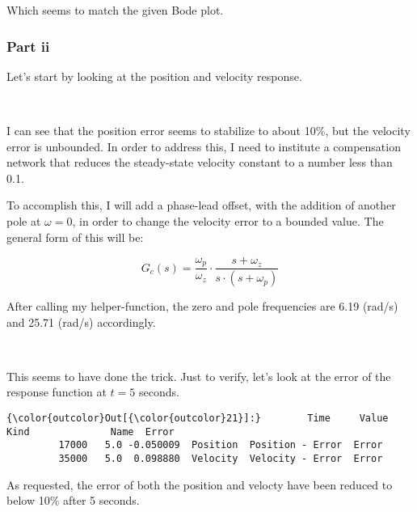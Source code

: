 \documentclass[11pt]{article}
\begin{document}
    Which seems to match the given Bode plot.

\subsubsection{Part ii}

Let's start by looking at the position and velocity response.
    \begin{center}
    \end{center}
    { \hspace*{\fill} \\}
    
    I can see that the position error seems to stabilize to about 10\%, but
the velocity error is unbounded. In order to address this, I need to
institute a compensation network that reduces the steady-state velocity
constant to a number less than 0.1.

To accomplish this, I will add a phase-lead offset, with the addition of
another pole at \(\omega =0\), in order to change the velocity error to
a bounded value. The general form of this will be:

\[G_c(s)=\frac{\omega _p}{\omega _z}\cdot \frac{s + \omega _z}{s\cdot(s+\omega _p)}\]

After calling my helper-function, the zero and pole frequencies are 6.19 (rad/s) and 25.71 (rad/s) accordingly.

    \begin{center}
    \end{center}
    { \hspace*{\fill} \\}
    
    This seems to have done the trick. Just to verify, let's look at the
error of the response function at \(t=5\) seconds.

\begin{Verbatim}[commandchars=\\\{\}]
{\color{outcolor}Out[{\color{outcolor}21}]:}        Time     Value      Kind              Name  Error
         17000   5.0 -0.050009  Position  Position - Error  Error
         35000   5.0  0.098880  Velocity  Velocity - Error  Error
\end{Verbatim}
            
    As requested, the error of both the position and velocty have been
reduced to below 10\% after 5 seconds.
\end{document}
